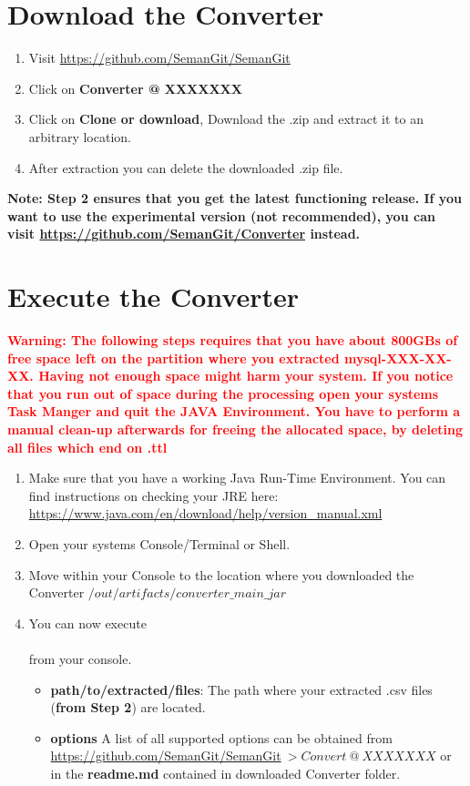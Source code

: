 \documentclass[11pt]{article}
\begin{document}
\section{Download the Converter}
\begin{enumerate}
\item Visit \url{https://github.com/SemanGit/SemanGit}
\item Click on \textbf{Converter @ XXXXXXX} 
\item Click on \textbf{Clone or download}, Download the .zip and extract it to an arbitrary location.
\item After extraction you can delete the downloaded .zip file.
\end{enumerate}
\textbf{Note: Step 2 ensures that you get the latest functioning release. If you want to use the experimental version (not recommended), you can visit  \url{https://github.com/SemanGit/Converter} instead.}

\section{Execute the Converter}
\textbf{\textcolor{red}{Warning: The following steps requires that you have about 800GBs of free space left on the partition where you extracted mysql-XXX-XX-XX. Having not enough space might harm your system. If you notice that you run out of space during the processing open your systems Task Manger and quit the JAVA Environment. You have to perform a manual clean-up afterwards for freeing the allocated space, by deleting all files which end on .ttl}}
\begin{enumerate}
\item Make sure that you have a working Java Run-Time Environment. You can find instructions on checking your JRE here: \url{https://www.java.com/en/download/help/version_manual.xml} 
\item Open your systems Console/Terminal or Shell.
\item Move within your Console to the location where you downloaded the Converter $/out/artifacts/converter\_main\_jar$
\item You can now execute \\[0.5cm]
\\[0.5cm]
from your console. 
\begin{itemize}
\item \textbf{path/to/extracted/files}: The path where your extracted .csv files (\textbf{from Step 2}) are located. 
\item \textbf{options} A list of all supported options can be obtained from 
\url{https://github.com/SemanGit/SemanGit}$~>Convert~ @~ XXXXXXX$
or in the \textbf{readme.md} contained in downloaded Converter folder.
\end{itemize}

\end{enumerate}
\newpage
{}


\end{document}

